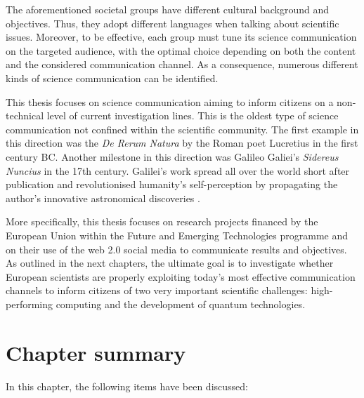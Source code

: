 The aforementioned societal groups have different cultural background and objectives. Thus, they adopt different languages when talking about scientific issues. Moreover, to be effective, each group must tune its science communication on the targeted audience, with the optimal choice depending on both the content and the considered communication channel. As a consequence, numerous different kinds of science communication can be identified.   

This thesis focuses on science communication aiming to inform citizens on a non-technical level of current investigation lines. This is the oldest type of science communication not confined within the scientific community. The first example in this direction was the \textit{De Rerum Natura} by the Roman poet Lucretius in the first century BC. Another milestone in this direction was Galileo Galiei's \textit{Sidereus Nuncius} in the 17th century. Galilei's work spread all over the world short after publication and revolutionised humanity's self-perception by propagating the author's innovative astronomical discoveries \cite{Burke}.

More specifically, this thesis focuses on research projects financed by the European Union within the Future and Emerging Technologies programme and on their use of the web 2.0 social media to communicate results and objectives. As outlined in the next chapters, the ultimate goal is to investigate whether European scientists are properly exploiting today's most effective communication channels to inform citizens of two very important scientific challenges: high-performing computing and the development of quantum technologies.

\section{Chapter summary} 
In this chapter, the following items have been discussed:

